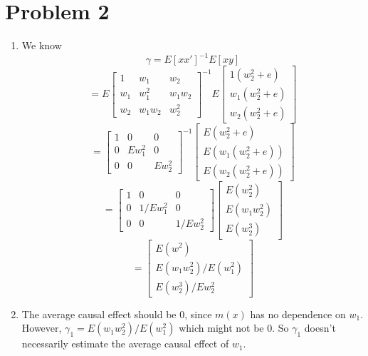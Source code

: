 \documentclass[10pt,letter]{article}
\begin{document}
\section*{Problem 2}
\begin{enumerate}[label=(\alph*)]
  \item We know
  \[ \gamma = E[xx']^{-1}E[xy] \]
  \[ = E\begin{bmatrix}
    1 & w_1 & w_2 \\
    w_1 & w_1^2 & w_1w_2 \\
    w_2 & w_1w_2 & w_2^2
  \end{bmatrix}^{-1} E\begin{bmatrix}
    1(w_2^2 + e)  \\
    w_1(w_2^2 + e)  \\
    w_2(w_2^2 + e)
  \end{bmatrix} \]
  \[ = \begin{bmatrix}
    1 & 0 & 0 \\
    0 & Ew_1^2 & 0 \\
    0 & 0 & Ew_2^2
  \end{bmatrix}^{-1} \begin{bmatrix}
    E(w_2^2 + e)  \\
    E(w_1(w_2^2 + e))  \\
    E(w_2(w_2^2 + e))
  \end{bmatrix} \]
  \[ = \begin{bmatrix}
    1 & 0 & 0 \\
    0 & 1/Ew_1^2 & 0 \\
    0 & 0 & 1/Ew_2^2
  \end{bmatrix} \begin{bmatrix}
    E(w_2^2)  \\
    E(w_1 w_2^2 )  \\
    E(w_2^3)
  \end{bmatrix} \]
  \[ = \begin{bmatrix}
    E(w^2) \\
    E(w_1w_2^2)/E(w_1^2)  \\
    E(w_2^3)/Ew_2^2
  \end{bmatrix}  \]
  \item The average causal effect should be $0$, since $m(x)$ has no dependence on $w_1$. However, $\gamma_1 = E(w_1w_2^2)/E(w_1^2)$ which might not be 0. So $\gamma_1$ doesn't necessarily estimate the average causal effect of $w_1$.
\end{enumerate}
\end{document}
